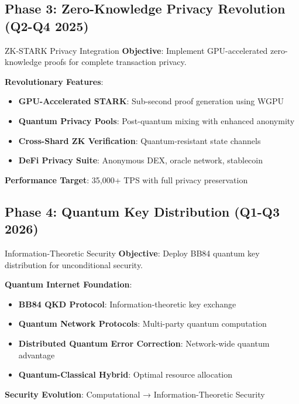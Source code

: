 \documentclass[11pt,a4paper]{article}
\begin{document}
\subsection{Phase 3: Zero-Knowledge Privacy Revolution (Q2-Q4 2025)}

\begin{phasebox}{ZK-STARK Privacy Integration}
\textbf{Objective}: Implement GPU-accelerated zero-knowledge proofs for complete transaction privacy.

\textbf{Revolutionary Features}:
\begin{itemize}
\item \textbf{GPU-Accelerated STARK}: Sub-second proof generation using WGPU
\item \textbf{Quantum Privacy Pools}: Post-quantum mixing with enhanced anonymity
\item \textbf{Cross-Shard ZK Verification}: Quantum-resistant state channels
\item \textbf{DeFi Privacy Suite}: Anonymous DEX, oracle network, stablecoin
\end{itemize}

\textbf{Performance Target}: 35,000+ TPS with full privacy preservation
\end{phasebox}

\subsection{Phase 4: Quantum Key Distribution (Q1-Q3 2026)}

\begin{phasebox}{Information-Theoretic Security}
\textbf{Objective}: Deploy BB84 quantum key distribution for unconditional security.

\textbf{Quantum Internet Foundation}:
\begin{itemize}
\item \textbf{BB84 QKD Protocol}: Information-theoretic key exchange
\item \textbf{Quantum Network Protocols}: Multi-party quantum computation
\item \textbf{Distributed Quantum Error Correction}: Network-wide quantum advantage
\item \textbf{Quantum-Classical Hybrid}: Optimal resource allocation
\end{itemize}

\textbf{Security Evolution}: Computational → Information-Theoretic Security
\end{phasebox}
\end{document}
